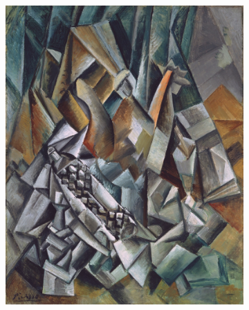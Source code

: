 \begin{figure}[H]
\begin{subfigure}[h]{0.32\textwidth}
        \includegraphics[width=\textwidth]{resources/content/style/still_life_with_liqueur_bottle.jpg}
    \end{subfigure}




\end{figure}

